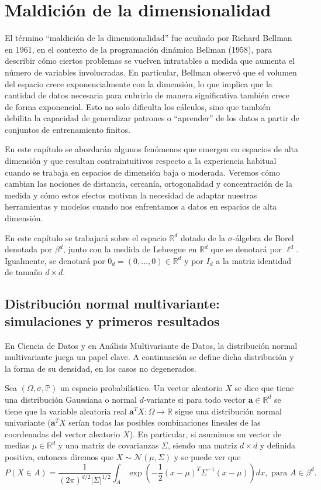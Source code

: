 \chapter{Maldición de la dimensionalidad}

El término ``maldición de la dimensionalidad'' fue acuñado por Richard Bellman en 1961, en el contexto de la programación dinámica Bellman (1958), para describir cómo ciertos problemas se vuelven intratables a medida que aumenta el número de variables involucradas. En particular, Bellman observó que el volumen del espacio crece exponencialmente con la dimensión, lo que implica que la cantidad de datos necesaria para cubrirlo de manera significativa también crece de forma exponencial. Esto no solo dificulta los cálculos, sino que también debilita la capacidad de generalizar patrones o ``aprender'' de los datos a partir de conjuntos de entrenamiento finitos.

En este capítulo se abordarán algunos fenómenos que emergen en espacios de alta dimensión y que resultan contraintuitivos respecto a la experiencia habitual cuando se trabaja en espacios de dimensión baja o moderada. Veremos cómo cambian las nociones de distancia, cercanía, ortogonalidad y concentración de la medida y cómo estos efectos motivan la necesidad de adaptar nuestras herramientas y modelos cuando nos enfrentamos a datos en espacios de alta dimensión.

En este capítulo se trabajará sobre el espacio $\mathbb{R}^d$ dotado de la $\sigma$-álgebra de Borel denotada por $\beta^d$, junto con la medida de Lebesgue en $\mathbb{R}^d$ que se denotará por $\ell^d$. Igualmente, se denotará por $0_d = (0, \dots, 0) \in \mathbb{R}^d$ y por $I_d$ a la matriz identidad de tamaño $d \times d$.

\section{Distribución normal multivariante: simulaciones y primeros resultados}

En Ciencia de Datos y en Análisis Multivariante de Datos, la distribución normal multivariante juega un papel clave. A continuación se define dicha distribución y la forma de su densidad, en los casos no degenerados.

\begin{definition}
Sea $\left(\Omega,\sigma,\mathbb{P}\right)$ un espacio probabilístico. Un vector aleatorio $X$ se dice que tiene una distribución Gaussiana o normal $d$-variante si para todo vector $\mathbf{a} \in \mathbb{R}^d$ se tiene que la variable aleatoria real $\mathbf{a}^T X : \Omega \to \mathbb{R}$ sigue una distribución normal univariante ($\mathbf{a}^T X$ serían todas las posibles combinaciones lineales de las coordenadas del vector aleatorio $X$). En particular, si asumimos un vector de medias $\mu \in \mathbb{R}^d$ y una matriz de covarianzas $\Sigma$, siendo una matriz $d \times d$ y definida positiva, entonces diremos que $X \sim \mathcal{N}(\mu, \Sigma)$ y se puede ver que
\[
P(X \in A) = \frac{1}{(2\pi)^{d/2} |\Sigma|^{1/2}} \int_A \exp\left( -\frac{1}{2} (x-\mu)^T \Sigma^{-1} (x-\mu) \right) dx, \text{ para } A \in \beta^d.
\]
\end{definition}

